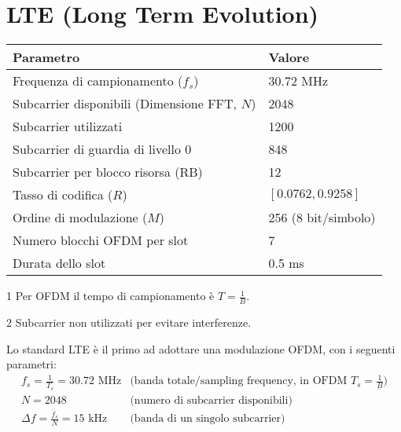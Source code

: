 \section*{LTE (Long Term Evolution)}


\begin{center}
    \begin{threeparttable}
        \begin{tabular}{|l|l|} 
            \hline
            \textbf{Parametro} & \textbf{Valore} \\
            \hline
            Frequenza di campionamento \tnote{1} ($f_s$) & 30.72 MHz \\
            \hline
            Subcarrier disponibili (Dimensione FFT, $N$) & 2048 \\
            \hline
            Subcarrier utilizzati & 1200 \\
            \hline
            Subcarrier di guardia \tnote{2 }di livello 0 & 848 \\
            \hline
            Subcarrier per blocco risorsa (RB) & 12 \\
            \hline
            Tasso di codifica ($R$) & $[0.0762, 0.9258]$ \\
            \hline
            Ordine di modulazione ($M$) & 256 (8 bit/simbolo) \\
            \hline
            Numero blocchi OFDM per slot & 7 \\
            \hline
            Durata dello slot & 0.5 ms \\
            \hline
        \end{tabular}
        \begin{tablenotes}
            \item[1] Per OFDM il tempo di campionamento è $T = \frac{1}{B}$.
            \item[2] Subcarrier non utilizzati per evitare interferenze.
        \end{tablenotes}
    \end{threeparttable}
\end{center}
Lo standard LTE è il primo ad adottare una modulazione OFDM, con i seguenti parametri:
\[
    \begin{array}{ll}
        f_s = \frac{1}{T_s} = 30.72 \text{ MHz} & \text{(banda totale/sampling frequency, in OFDM $T_s=\frac{1}{B}$)} \\
        N = 2048 & \text{(numero di subcarrier disponibili)} \\
        \Delta f = \frac{f_s}{N} = 15 \text{ kHz} & \text{(banda di un singolo subcarrier)} \\
    \end{array}    
\]
